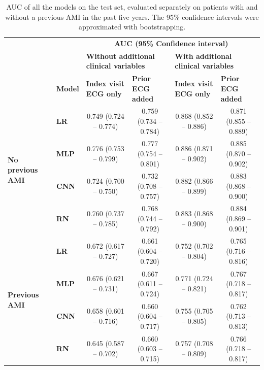 \documentclass[preprint]{elsarticle}
\begin{document}
\renewcommand{\arraystretch}{1.2}
\begin{table}[H]
  \centering
  \scriptsize
\begin{adjustbox}{center}
\begin{tabular}{@{}llcccc@{}}
  \toprule
  & & \multicolumn{4}{c}{\textbf{AUC (95\% Confidence interval)}} \\
  \cmidrule(lr){3-6}
  & & \multicolumn{2}{l}{\textbf{Without additional clinical variables}} & \multicolumn{2}{l}{\textbf{With additional clinical variables}} \\
  \cmidrule(lr){3-4}\cmidrule(lr){5-6}
  & \multicolumn{1}{l}{\textbf{Model}} & \multicolumn{1}{l}{\textbf{Index visit ECG only}} & \multicolumn{1}{l}{\textbf{Prior ECG added}} & \multicolumn{1}{l}{\textbf{Index visit ECG only}} & \multicolumn{1}{l}{\textbf{Prior ECG added}} \\
  \midrule

\multirow{4}{*}{\begin{minipage}{0.65in}\textbf{No previous AMI}\end{minipage}} %
& \textbf{LR} & 0.749 (0.724 -- 0.774) & 0.759 (0.734 -- 0.784) & 0.868 (0.852 -- 0.886) & 0.871 (0.855 -- 0.889) \\
& \textbf{MLP} & 0.776 (0.753 -- 0.799) & 0.777 (0.754 -- 0.801) & 0.886 (0.871 -- 0.902) & 0.885 (0.870 -- 0.902) \\
& \textbf{CNN} & 0.724 (0.700 -- 0.750) & 0.732 (0.708 -- 0.757) & 0.882 (0.866 -- 0.899) & 0.883 (0.868 -- 0.900) \\
& \textbf{RN} & 0.760 (0.737 -- 0.785) & 0.768 (0.744 -- 0.792) & 0.883 (0.868 -- 0.900) & 0.884 (0.869 -- 0.901) \\
  \cmidrule(lr){1-2}
\multirow{4}{*}{\begin{minipage}{0.65in}\textbf{Previous AMI}\end{minipage}} %
& \textbf{LR} & 0.672 (0.617 -- 0.727) & 0.661 (0.604 -- 0.720) & 0.752 (0.702 -- 0.804) & 0.765 (0.716 -- 0.816) \\
& \textbf{MLP} & 0.676 (0.621 -- 0.731) & 0.667 (0.611 -- 0.724) & 0.771 (0.724 -- 0.821) & 0.767 (0.718 -- 0.817) \\
& \textbf{CNN} & 0.658 (0.601 -- 0.716) & 0.660 (0.604 -- 0.717) & 0.755 (0.705 -- 0.805) & 0.762 (0.713 -- 0.813) \\
& \textbf{RN} & 0.645 (0.587 -- 0.702) & 0.660 (0.603 -- 0.715) & 0.757 (0.708 -- 0.809) & 0.766 (0.718 -- 0.817) \\

\bottomrule
\end{tabular}
\end{adjustbox}
\caption{AUC of all the models on the test set, evaluated separately on patients with and without a previous AMI in the past five years. The 95\% confidence intervals were approximated with bootstrapping.} 
\label{table:appendix:ami}
\end{table}
\renewcommand{\arraystretch}{1}
\end{document}
